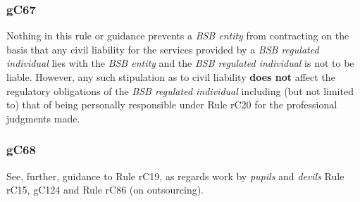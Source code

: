 \subsubsection{\color{darkgrey}gC67}

Nothing in this rule or guidance prevents a \emph{BSB entity} from
contracting on the basis that any civil liability for the services
provided by a \emph{BSB regulated individual} lies with the \emph{BSB
entity} and the \emph{BSB regulated individual} is not to be liable.
However, any such stipulation as to civil liability \textcolor{myred}{\textbf{does not}} affect the
regulatory obligations of the \emph{BSB regulated individual} including
(but not limited to) that of being personally responsible under Rule
rC20 for the professional judgments made.

\subsubsection{\color{darkgrey}gC68}

See, further, guidance to Rule rC19, as regards work by \emph{pupils}
and \emph{devils} Rule rC15, gC124 and Rule rC86 (on outsourcing).




